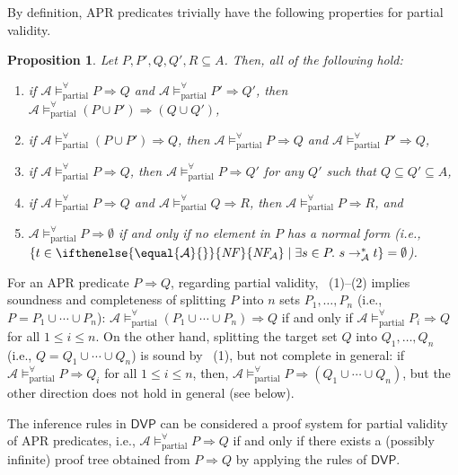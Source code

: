 \documentclass[10pt,a4paper]{article}
\newtheorem{proposition}[theorem]{Proposition}
\newcommand{\bfnum}[1]{(#1)}
\def\cA{\mathcal{A}}
\newcommand{\NF}[1][]{\ifthenelse{\equal{#1}{}}{\mathit{NF}}{\mathit{NF\!}_{#1}}}
\newcommand{\ReachPred}[2]{#1 \Rightarrow #2}
\newcommand{\Valid}[3]{#2 \mathrel{\mathrel{\models^\forall_{\mathrm{#1}}}} #3}
\newcommand{\PartiallyValid}[2][\cA]{\Valid{partial}{#1}{#2}}
\newcommand{\DVP}[1][]{\mathsf{DVP}}
\begin{document}
By definition, APR predicates trivially have the following properties for partial validity.
\begin{proposition}
	\label{prop:basic-properties-of-partially-valid-APR-problems}
	Let $P,P',Q,Q',R \subseteq A$.
	Then, all of the following hold:
	\begin{enumerate}
		\renewcommand{\labelenumi}{(\arabic{enumi})}
		\leftskip=1ex
		\item if
		      $\PartiallyValid{\ReachPred{P}{Q}}$ and $\PartiallyValid{\ReachPred{P'}{Q'}}$,
		      then
		      $\PartiallyValid{\ReachPred{(P\cup P')}{(Q\cup Q')}}$,
		\item if
		      $\PartiallyValid{\ReachPred{(P\cup P')}{Q}}$,
		      then
		      $\PartiallyValid{\ReachPred{P}{Q}}$ and $\PartiallyValid{\ReachPred{P'}{Q}}$,
		\item if
		      $\PartiallyValid{\ReachPred{P}{Q}}$,
		      then
		      $\PartiallyValid{\ReachPred{P}{Q'}}$
		      for any $Q'$ such that $Q \subseteq Q' \subseteq A$,
		\item if
		      $\PartiallyValid{\ReachPred{P}{Q}}$ and $\PartiallyValid{\ReachPred{Q}{R}}$,
		      then
		      $\PartiallyValid{\ReachPred{P}{R}}$,
		      and
		\item $\PartiallyValid{\ReachPred{P}{\emptyset}}$
		      if and only if
		      no element in $P$ has a normal form (i.e., $\{ t \in \NF[\cA] \mid \exists s \in P.\ s \mathrel{\to_\cA^*} t \} = \emptyset$).

	\end{enumerate}
\end{proposition}


For an APR predicate $\ReachPred{P}{Q}$, regarding partial validity,
~\bfnum{1}--\bfnum{2} implies
soundness and completeness of splitting $P$ into $n$ sets $P_1,\ldots,P_n$ (i.e., $P = P_1 \cup \cdots \cup P_n$):
$\PartiallyValid{\ReachPred{(P_1\cup\cdots\cup P_n)}{Q}}$
if and only if
$\PartiallyValid{\ReachPred{P_i}{Q}}$ for all $1 \leq i \leq n$.
On the other hand, splitting the target set $Q$ into $Q_1,\ldots,Q_n$ (i.e., $Q=Q_1\cup\cdots\cup Q_n$) is sound by ~\bfnum{1}, but not complete in general:
if
$\PartiallyValid{\ReachPred{P}{Q_i}}$ for all $1 \leq i \leq n$,
then,
$\PartiallyValid{\ReachPred{P}{(Q_1\cup\cdots\cup Q_n)}}$,
but
the other direction does not hold in general (see  below).


The inference rules in $\DVP$ can be considered a proof system for partial validity of APR predicates, i.e.,
$\PartiallyValid{\ReachPred{P}{Q}}$
if and only if there exists a (possibly infinite) proof tree obtained from $\ReachPred{P}{Q}$ by applying the rules of $\DVP$.
\end{document}
